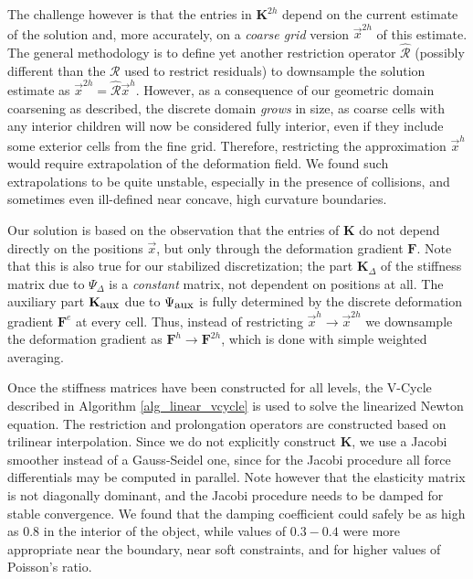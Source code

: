 The challenge however is that the entries in $\mathbf{K}^{2h}$ depend on the current estimate of the solution and, more accurately, on a
\emph{coarse grid} version $\vec{x}^{2h}$ of this estimate. The general methodology is to define yet another restriction operator $\hat{\mathcal{R}}$ (possibly different than the
$\mathcal{R}$ used to restrict residuals) to downsample the solution estimate as $\vec{x}^{2h}=\hat{\mathcal{R}}\vec{x}^h$. However, as a consequence of our geometric domain coarsening
as described, the discrete domain \emph{grows} in size, as coarse cells with any interior children will now be considered fully interior, even if they include some
exterior cells from the fine grid. Therefore, restricting the approximation $\vec{x}^h$ would require extrapolation of the deformation field. We found such extrapolations to be
quite unstable, especially in the presence of collisions, and sometimes even ill-defined near concave, high curvature boundaries.

Our solution is based on the observation that the entries of $\mathbf{K}$ do not depend directly on the positions $\vec{x}$, but only through the deformation gradient $\mathbf{F}$. Note
that this is also true for our stabilized discretization; the part $\mathbf{K}_\Delta$ of the stiffness matrix due to $\Psi_\Delta$ is a \emph{constant} matrix, not dependent on positions
at all. The auxiliary part $\mathbf{K}_{\mbox{\small aux}}$ due to $\Psi_{\mbox{\small aux}}$ is fully determined by the discrete deformation gradient $\mathbf{F}^e$ at every
cell. Thus, instead of restricting $\vec{x}^h\rightarrow\vec{x}^{2h}$ we downsample the deformation gradient as $\mathbf{F}^h\rightarrow\mathbf{F}^{2h}$, which is done with
simple weighted averaging. 

Once the stiffness matrices have been constructed for all levels, the V-Cycle described in Algorithm \ref{alg_linear_vcycle} is used to solve the linearized
Newton equation. The restriction and prolongation operators are constructed based on trilinear interpolation. Since we do not explicitly construct $\mathbf{K}$, we use a
Jacobi smoother instead of a Gauss-Seidel one, since for the Jacobi procedure all force differentials may be computed in parallel. Note however that the elasticity matrix is not
diagonally dominant, and the Jacobi procedure needs to be damped for stable convergence. We found that the damping coefficient could safely be as high as $0.8$ in the interior of the
object, while values of $0.3-0.4$ were more appropriate near the boundary, near soft constraints, and for higher values of Poisson's ratio.

